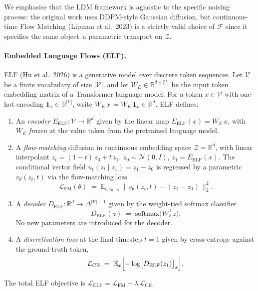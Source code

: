 \documentclass[11pt]{article}
\begin{document}
We emphasise that the LDM framework is agnostic to the specific noising
process: the original work uses DDPM-style Gaussian diffusion, but
continuous-time Flow Matching (Lipman et al.\ 2023) is a strictly valid
choice of $\mathcal{F}$ since it specifies the same object--a parametric
transport on $\mathcal{Z}$.

\paragraph{Embedded Language Flows (ELF).}
ELF (Hu et al.\ 2026) is a generative model over discrete token sequences.
Let $\mathcal{V}$ be a finite vocabulary of size $|\mathcal{V}|$, and let
$W_{E}\in\mathbb{R}^{d\times|\mathcal{V}|}$ be the input token embedding
matrix of a Transformer language model. For a token $x\in\mathcal{V}$ with
one-hot encoding $\mathbf{1}_{x}\in\mathbb{R}^{|\mathcal{V}|}$, write
$W_{E}\,x \coloneqq W_{E}\,\mathbf{1}_{x}\in\mathbb{R}^{d}$. ELF defines:

\begin{enumerate}
  \item An \emph{encoder} $E_{\mathrm{ELF}}\colon \mathcal{V} \to \mathbb{R}^{d}$
        given by the linear map $E_{\mathrm{ELF}}(x) = W_{E}\,x$, with $W_{E}$
        \emph{frozen} at the value taken from the pretrained language model.
  \item A \emph{flow-matching} diffusion in continuous embedding space
        $\mathcal{Z}=\mathbb{R}^{d}$, with linear interpolant
        $z_{t} = (1-t)\,z_{0} + t\,z_{1}$, $z_{0}\sim\mathcal{N}(0,I)$,
        $z_{1}=E_{\mathrm{ELF}}(x)$. The conditional vector field
        $u_{t}(z_{t}\mid z_{1}) = z_{1}-z_{0}$ is regressed by a parametric
        $v_{\theta}(z_{t},t)$ via the flow-matching loss
        \[
          \mathcal{L}_{\mathrm{FM}}(\theta)
          \;=\;
          \mathbb{E}_{t,z_{0},z_{1}}
          \bigl\|\, v_{\theta}(z_{t},t) - (z_{1}-z_{0}) \,\bigr\|_{2}^{2}.
        \]
  \item A \emph{decoder} $D_{\mathrm{ELF}}\colon \mathbb{R}^{d} \to \Delta^{|\mathcal{V}|-1}$
        given by the weight-tied softmax classifier
        \[
          D_{\mathrm{ELF}}(z) \;=\; \mathrm{softmax}\bigl(W_{E}^{\top} z\bigr).
        \]
        No new parameters are introduced for the decoder.
  \item A \emph{discretisation loss} at the final timestep $t=1$ given by
        cross-entropy against the ground-truth token,
        \[
          \mathcal{L}_{\mathrm{CE}}
          \;=\;
          \mathbb{E}_{x}\Bigl[ -\log\bigl[D_{\mathrm{ELF}}(z_{1})\bigr]_{x} \Bigr].
        \]
\end{enumerate}
The total ELF objective is
$\mathcal{L}_{\mathrm{ELF}} = \mathcal{L}_{\mathrm{FM}} + \lambda\,\mathcal{L}_{\mathrm{CE}}$.
\end{document}
